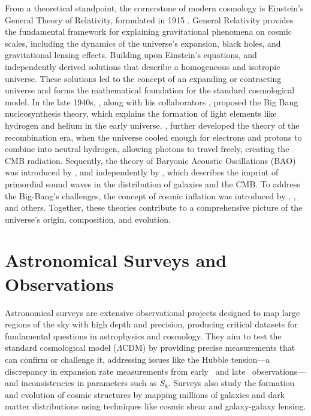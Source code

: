 From a theoretical standpoint, the cornerstone of modern cosmology is 
Einstein's General Theory of Relativity, formulated in 1915 \citep{1915SPAW.......844E}. General Relativity provides the fundamental framework for explaining gravitational phenomena on cosmic scales, including the dynamics of the universe's expansion, black holes, and gravitational lensing effects. Building upon Einstein's equations, \citet{1922ZPhy...10..377F} and \citet{1931MNRAS..91..483L} independently derived solutions that describe a homogeneous and isotropic universe. These solutions led to the concept of an expanding or contracting universe and forms the mathematical foundation for the standard cosmological model. In the late 1940s, \citet{1948Natur.162..680G}, along with his collaborators \citet{1948Natur.162..774A}, proposed the Big Bang nucleosynthesis theory, which explains the formation of light elements like hydrogen and helium in the early universe. 
\citet{1968ApJ...153....1P}, \citet{1969Ap&SS...4..301Z} further developed the theory of the recombination era, when the universe cooled enough for electrons and protons to combine into neutral hydrogen, allowing photons to travel freely, creating the CMB radiation. Sequently, the theory of Baryonic Acoustic Oscillations (BAO) was introduced by \citet{1970Ap&SS...7....3S}, and independently by \citet{1970ApJ...162..815P}, which describes the imprint of primordial sound waves in the distribution of galaxies and the CMB. To address the Big-Bang's challenges, the concept of cosmic inflation was introduced by \citet{1981PhRvD..23..347G}, \citet{1982PhLB..108..389L}, and others. Together, these theories contribute to a comprehensive picture of the universe's origin, composition, and evolution.

\section{Astronomical Surveys and Observations}
Astronomical surveys are extensive observational projects designed to map large regions of the sky with high depth and precision, producing critical datasets for fundamental questions in astrophysics and cosmology. They aim to test the standard cosmological model ($\Lambda$CDM) by providing precise measurements that can confirm or challenge it, addressing issues like the Hubble tension—a discrepancy in expansion rate measurements from early~\citep{2016A&A...594A..13P} and late~\citep{2019ApJ...876...85R} observations—and inconsistencies in parameters such as $S_8$. Surveys also study the formation and evolution of cosmic structures by mapping millions of galaxies and dark matter distributions using techniques like cosmic shear and galaxy-galaxy lensing\citep{2013MNRAS.432.1544M, 2022PhRvD.105b3520A}.


